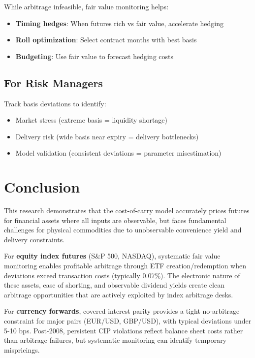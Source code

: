 \documentclass[12pt,a4paper]{article}
\begin{document}
While arbitrage infeasible, fair value monitoring helps:

\begin{itemize}
    \item \textbf{Timing hedges}: When futures rich vs fair value, accelerate hedging
    \item \textbf{Roll optimization}: Select contract months with best basis
    \item \textbf{Budgeting}: Use fair value to forecast hedging costs
\end{itemize}

\subsection{For Risk Managers}

Track basis deviations to identify:
\begin{itemize}
    \item Market stress (extreme basis = liquidity shortage)
    \item Delivery risk (wide basis near expiry = delivery bottlenecks)
    \item Model validation (consistent deviations = parameter misestimation)
\end{itemize}

\newpage
\section{Conclusion}

This research demonstrates that the cost-of-carry model accurately prices futures for financial assets where all inputs are observable, but faces fundamental challenges for physical commodities due to unobservable convenience yield and delivery constraints.

For \textbf{equity index futures} (S\&P 500, NASDAQ), systematic fair value monitoring enables profitable arbitrage through ETF creation/redemption when deviations exceed transaction costs (typically 0.07\%). The electronic nature of these assets, ease of shorting, and observable dividend yields create clean arbitrage opportunities that are actively exploited by index arbitrage desks.

For \textbf{currency forwards}, covered interest parity provides a tight no-arbitrage constraint for major pairs (EUR/USD, GBP/USD), with typical deviations under 5-10 bps. Post-2008, persistent CIP violations reflect balance sheet costs rather than arbitrage failures, but systematic monitoring can identify temporary mispricings.
\end{document}
